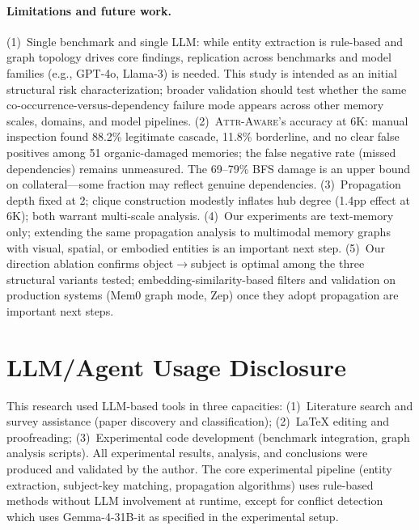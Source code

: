 \documentclass{article}
\newcommand{\attraware}{\textsc{Attr-Aware}}
\begin{document}
\paragraph{Limitations and future work.}
(1)~Single benchmark and single LLM: while entity extraction is rule-based and graph topology drives core findings, replication across benchmarks and model families (e.g., GPT-4o, Llama-3) is needed.
This study is intended as an initial structural risk characterization; broader validation should test whether the same co-occurrence-versus-dependency failure mode appears across other memory scales, domains, and model pipelines.
(2)~\attraware{}'s accuracy at 6K: manual inspection found 88.2\% legitimate cascade, 11.8\% borderline, and no clear false positives among 51 organic-damaged memories; the false negative rate (missed dependencies) remains unmeasured.
The 69--79\% BFS damage is an upper bound on collateral---some fraction may reflect genuine dependencies.
(3)~Propagation depth fixed at 2; clique construction modestly inflates hub degree (1.4pp effect at 6K); both warrant multi-scale analysis.
(4)~Our experiments are text-memory only; extending the same propagation analysis to multimodal memory graphs with visual, spatial, or embodied entities is an important next step.
(5)~Our direction ablation confirms object$\rightarrow$subject is optimal among the three structural variants tested; embedding-similarity-based filters and validation on production systems (Mem0 graph mode, Zep) once they adopt propagation are important next steps.

\section*{LLM/Agent Usage Disclosure}

This research used LLM-based tools in three capacities:
(1)~Literature search and survey assistance (paper discovery and classification);
(2)~LaTeX editing and proofreading;
(3)~Experimental code development (benchmark integration, graph analysis scripts).
All experimental results, analysis, and conclusions were produced and validated by the author.
The core experimental pipeline (entity extraction, subject-key matching, propagation algorithms) uses rule-based methods without LLM involvement at runtime, except for conflict detection which uses Gemma-4-31B-it as specified in the experimental setup.




\end{document}
